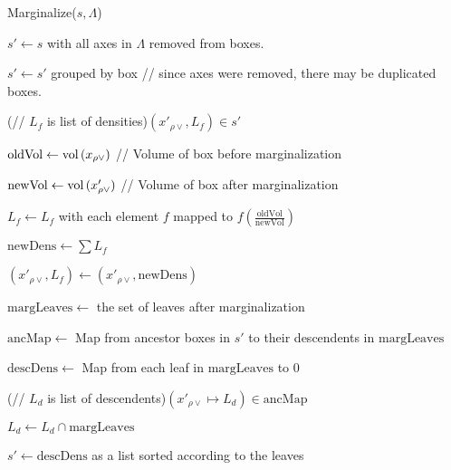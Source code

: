 \documentclass[../histograms.tex]{subfiles}
\begin{document}
  \begin{algorithm}
    \caption{Marginalize($s, \Lambda$)}
    \label{alg:marginalize}

    $s' \gets s$ with all axes in $\Lambda$ removed from boxes.

    $s' \gets s'$ grouped by box // since axes were removed, there may be duplicated boxes.

    \For(// $L_f$ is list of densities){$(x'_{\rho \vee}, L_f) \in s'$}{
      $\mathrm{oldVol} \gets {\mathop{\rm vol\,}} (x_{\rho \vee})$ // Volume of box before marginalization

      $\mathrm{newVol} \gets {\mathop{\rm vol\,}} (x'_{\rho \vee})$ // Volume of box after marginalization

      $L_f \gets L_f$ with each element $f$ mapped to $f \left( \frac{\mathrm{oldVol}}{\mathrm{newVol}} \right)$

      $\mathrm{newDens} \gets \sum L_f$

      $(x'_{\rho \vee}, L_f) \gets (x'_{\rho \vee}, \mathrm{newDens})$
    }

    $\mathrm{margLeaves} \gets $ the set of leaves after marginalization

    $\mathrm{ancMap} \gets $ Map from ancestor boxes in $s'$ to their descendents in $\mathrm{margLeaves}$

    $\mathrm{descDens} \gets $ Map from each leaf in $\mathrm{margLeaves}$ to $0$


    \For(// $L_d$ is list of descendents){$(x'_{\rho \vee} \mapsto L_d) \in \mathrm{ancMap}$}{
      $L_d \gets L_d \cap \mathrm{margLeaves}$

    }

    $s' \gets \mathrm{descDens}$ as a list sorted according to the leaves

  \end{algorithm}
\end{document}
